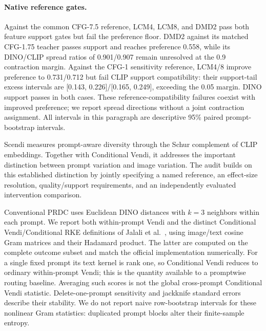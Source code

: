 \paragraph{Native reference gates.}
Against the common CFG-7.5 reference, LCM4, LCM8, and DMD2 pass both feature
support gates but fail the preference floor. DMD2 against its matched CFG-1.75
teacher passes support and reaches preference 0.558, while its DINO/CLIP spread
ratios of 0.901/0.907 remain unresolved at the 0.9 contraction margin.
Against the CFG-1 sensitivity reference, LCM4/8 improve preference to
0.731/0.712 but fail CLIP support compatibility: their support-tail excess
intervals are [0.143, 0.226]/[0.165, 0.249], exceeding the 0.05 margin.
DINO support passes in both cases. These reference-compatibility failures
coexist with improved preference; we report spread directions without a joint
contraction assignment. All intervals in this paragraph are descriptive
95\% paired prompt-bootstrap intervals.

Scendi \cite{ospanov2025scendi} measures prompt-aware diversity through the
Schur complement of CLIP embeddings. Together with Conditional Vendi, it
addresses the important distinction between prompt variation and image
variation. The audit builds on this established distinction by jointly specifying a
named reference, an effect-size resolution, quality/support requirements,
and an independently evaluated intervention comparison.

Conventional PRDC \cite{naeem2020density} uses Euclidean DINO distances with
$k=3$ neighbors within each prompt. We report both within-prompt Vendi
\cite{friedman2023vendi} and the distinct Conditional Vendi/Conditional RKE
definitions of Jalali et al.\ \cite{jalali2026conditional}, using image/text
cosine Gram matrices and their Hadamard product. The latter are computed on
the complete outcome subset and match the official implementation numerically.
For a single fixed prompt its text kernel is rank one, so Conditional Vendi
reduces to ordinary within-prompt Vendi; this is the quantity available to a
promptwise routing baseline. Averaging such scores is not the global
cross-prompt Conditional Vendi statistic.
Delete-one-prompt sensitivity and jackknife standard errors describe their
stability. We do not report naive row-bootstrap intervals for these nonlinear
Gram statistics: duplicated prompt blocks alter their finite-sample entropy.

